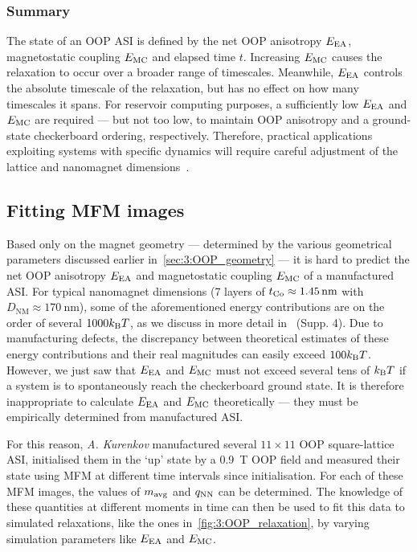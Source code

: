 \subsubsection{Summary}
The state of an OOP ASI is defined by the net OOP anisotropy $E_\mathrm{EA}$, magnetostatic coupling $E_\mathrm{MC}$ and elapsed time $t$.
Increasing $E_\mathrm{MC}$ causes the relaxation to occur over a broader range of timescales.
Meanwhile, $E_\mathrm{EA}$ controls the absolute timescale of the relaxation, but has no effect on how many timescales it spans.
For reservoir computing purposes, a sufficiently low $E_\mathrm{EA}$ and $E_\mathrm{MC}$ are required --- but not too low, to maintain OOP anisotropy and a ground-state checkerboard ordering, respectively.
Therefore, practical applications exploiting systems with specific dynamics will require careful adjustment of the lattice and nanomagnet dimensions~\cite{KUR-24}.

\subsection{Fitting MFM images}\label{sec:3:MFM}
Based only on the magnet geometry --- determined by the various geometrical parameters discussed earlier in~\cref{sec:3:OOP_geometry} --- it is hard to predict the net OOP anisotropy $E_\mathrm{EA}$ and magnetostatic coupling $E_\mathrm{MC}$ of a manufactured ASI.
For typical nanomagnet dimensions (7 layers of $t_{\ce{Co}} \approx \SI{1.45}{\nano\metre}$ with $D_\mathrm{NM} \approx \SI{170}{\nano\metre}$), some of the aforementioned energy contributions are on the order of several $1000 \kBT$, as we discuss in more detail in~ (Supp. 4). %
Due to manufacturing defects, the discrepancy between theoretical estimates of these energy contributions and their real magnitudes can easily exceed $100 \kBT$. %
However, we just saw that $E_\mathrm{EA}$ and $E_\mathrm{MC}$ must not exceed several tens of $\kBT$ if a system is to spontaneously reach the checkerboard ground state.
It is therefore inappropriate to calculate $E_\mathrm{EA}$ and $E_\mathrm{MC}$ theoretically --- they must be empirically determined from manufactured ASI. \\\par
For this reason, \textit{A. Kurenkov} manufactured several $11 \times 11$ OOP square-lattice ASI, initialised them in the `up' state by a \SI{0.9}{\tesla} OOP field and measured their state using MFM at different time intervals since initialisation.
For each of these MFM images, the values of $m_\mathrm{avg}$ and $q_\mathrm{NN}$ can be determined.
The knowledge of these quantities at different moments in time can then be used to fit this data to simulated relaxations, like the ones in~\cref{fig:3:OOP_relaxation}, by varying simulation parameters like $E_\mathrm{EA}$ and $E_\mathrm{MC}$.

